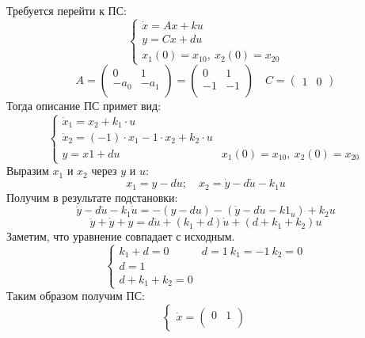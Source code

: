 \documentclass[../../TAU.tex]{subfiles}
\begin{document}
    {
        Требуется перейти к ПС:
        $$
        \begin{cases}
            \dot x=Ax+ku \\
            y=Cx+du      \\
            x_1(0)=x_{10},\ x_2(0)=x_{20}
        \end{cases}
        $$
        $$
            A=
            \begin{pmatrix}
                0  & 1  \\
                -a_0 & -a_1 \\
            \end{pmatrix}
            =
            \begin{pmatrix}
                0  & 1  \\
                -1 & -1 \\
            \end{pmatrix}\quad 
            C=
            \begin{pmatrix}
                1 & 0 
            \end{pmatrix}
        $$
        Тогда описание ПС примет вид:
        $$
        \begin{cases}
            \dot x_1 = x_2+k_1\cdot u                        \\
            \dot x_2 = (-1)\cdot x_1 -1\cdot x_2 +k_2\cdot u \\
            y = x1+du & x_1(0)=x_{10},\ x_2(0)=x_{20}
        \end{cases}
        $$
        Выразим $x_1$ и $x_2$ через $y$ и $u$:
        $$
            x_1=y-du;\quad x_2=\dot y-d\dot u-k_1 u
        $$
        Получим в результате подстановки:
        $$
            \ddot y - d\ddot u - k_1\dot u=-(y-du)-(\dot y-d\dot u-k1_u)+k_2u
        $$
        $$
            \ddot y + \dot y +y=d\ddot u+(k_1+d)\dot u+(d+k_1+k_2)u
        $$
        Заметим, что уравнение совпадает с исходным.
        $$
            \begin{cases}
                k_1+d=0 & d=1\ k_1=-1\ k_2=0 \\
                d = 1                        \\
                d+k_1+k_2=0
            \end{cases}
        $$ 
        Таким образом получим ПС:
        $$
            \begin{cases}
                \dot x = 
                \begin{pmatrix}
                     0 &  1 \\

\end{pmatrix}
\end{cases}$$}
\end{document}
